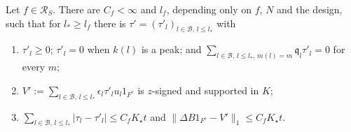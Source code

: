 \begin{lemma}\label{lem:exactswitch}
Let $f\in\mathcal R_S$.  There are $C_f<\infty$ and $l_f$, depending only
on $f$, $N$ and the design, such that for $l_*\ge l_f$ there is
$\tau'=(\tau'_l)_{l\in\mathcal B,\,l\le l_*}$ with
\begin{enumerate}
\item[(a)] $\tau'_l\ge0$; $\tau'_l=0$ when $k(l)$ is a peak; and
$\sum_{l\in\mathcal B,\,l\le l_*,\,m(l)=m}\mathfrak q_l\tau'_l=0$ for every
$m$;
\item[(b)] $V':=\sum_{l\in\mathcal B,\,l\le l_*}\epsilon_l\tau'_lu_l1_{F^c}$
is $z$-signed and supported in $K$;
\item[(c)] $\sum_{l\in\mathcal B,\,l\le l_*}|\tau_l-\tau'_l|\le C_fK_\star t$
and $\|\Delta B1_{F^c}-V'\|_1\le C_fK_\star t$.
\end{enumerate}
\end{lemma}

